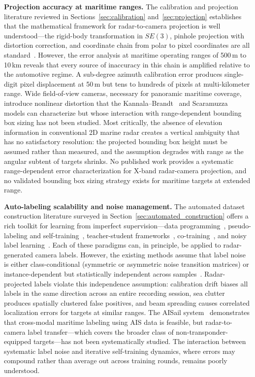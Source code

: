 \textbf{Projection accuracy at maritime ranges.} The calibration and projection literature reviewed in Sections~\ref{sec:calibration} and~\ref{sec:projection} establishes that the mathematical framework for radar-to-camera projection is well understood---the rigid-body transformation in $SE(3)$, pinhole projection with distortion correction, and coordinate chain from polar to pixel coordinates are all standard~\cite{persic2019extrinsic,zhang2000flexible}. However, the error analysis at maritime operating ranges of 500\,m to 10\,km reveals that every source of inaccuracy in this chain is amplified relative to the automotive regime. A sub-degree azimuth calibration error produces single-digit pixel displacement at 50\,m but tens to hundreds of pixels at multi-kilometer range. Wide field-of-view cameras, necessary for panoramic maritime coverage, introduce nonlinear distortion that the Kannala--Brandt~\cite{kannala2006generic} and Scaramuzza~\cite{scaramuzza2006toolbox} models can characterize but whose interaction with range-dependent bounding box sizing has not been studied. Most critically, the absence of elevation information in conventional 2D marine radar creates a vertical ambiguity that has no satisfactory resolution: the projected bounding box height must be assumed rather than measured, and the assumption degrades with range as the angular subtent of targets shrinks. No published work provides a systematic range-dependent error characterization for X-band radar-camera projection, and no validated bounding box sizing strategy exists for maritime targets at extended range.

\textbf{Auto-labeling scalability and noise management.} The automated dataset construction literature surveyed in Section~\ref{sec:automated_construction} offers a rich toolkit for learning from imperfect supervision---data programming~\cite{ratner2016data,ratner2017snorkel}, pseudo-labeling and self-training~\cite{lee2013pseudo,xie2020self,sohn2020fixmatch}, teacher-student frameworks~\cite{tarvainen2017mean}, co-training~\cite{blum1998combining}, and noisy label learning~\cite{natarajan2013learning,song2022learning,patrini2017making}. Each of these paradigms can, in principle, be applied to radar-generated camera labels. However, the existing methods assume that label noise is either class-conditional (symmetric or asymmetric noise transition matrices) or instance-dependent but statistically independent across samples~\cite{cheng2022instance}. Radar-projected labels violate this independence assumption: calibration drift biases all labels in the same direction across an entire recording session, sea clutter produces spatially clustered false positives, and beam spreading causes correlated localization errors for targets at similar ranges. The AISail system~\cite{kim2024sailing} demonstrates that cross-modal maritime labeling using AIS data is feasible, but radar-to-camera label transfer---which covers the broader class of non-transponder-equipped targets---has not been systematically studied. The interaction between systematic label noise and iterative self-training dynamics, where errors may compound rather than average out across training rounds, remains poorly understood.

